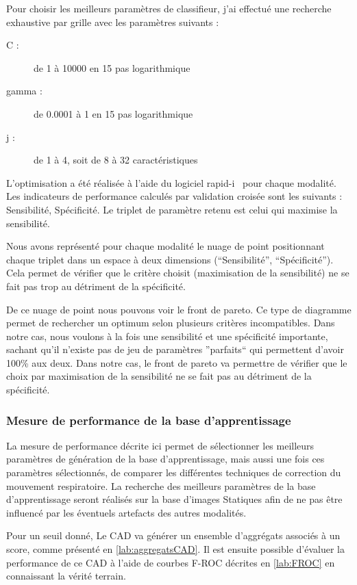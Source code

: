 Pour choisir les meilleurs paramètres de classifieur, j'ai effectué une recherche exhaustive par grille avec les paramètres suivants :

\begin{description}
 \item [C :] de 1 à 10000 en 15 pas logarithmique
 \item [gamma :] de 0.0001 à 1 en 15 pas logarithmique
 \item [j :] de 1 à 4, soit de 8 à 32 caractéristiques
\end{description}

L'optimisation a été réalisée à l'aide du logiciel rapid-i~\cite{mierswa2006} pour chaque modalité. Les indicateurs de performance calculés par validation croisée sont les suivants : Sensibilité, Spécificité. Le triplet de paramètre retenu est celui qui maximise la sensibilité.

Nous avons représenté pour chaque modalité le nuage de point positionnant chaque triplet dans un espace à deux dimensions (``Sensibilité'', ``Spécificité''). Cela permet de vérifier que le critère choisit (maximisation de la sensibilité) ne se fait pas trop au détriment de la spécificité.

De ce nuage de point nous pouvons voir le front de pareto. Ce type de diagramme permet de rechercher un optimum selon plusieurs critères incompatibles. Dans notre cas, nous voulons à la fois une sensibilité et une spécificité importante, sachant qu'il n'existe pas de jeu de paramètres ''parfaits`` qui permettent d'avoir 100\% aux deux. Dans notre cas, le front de pareto va permettre de vérifier que le choix par maximisation de la sensibilité ne se fait pas au détriment de la spécificité.


\subsubsection{Mesure de performance de la base d'apprentissage}

La mesure de performance décrite ici permet de sélectionner les meilleurs paramètres de génération de la base d'apprentissage, mais aussi une fois ces paramètres sélectionnés, de comparer les différentes techniques de correction du mouvement respiratoire. La recherche des meilleurs paramètres de la base d'apprentissage seront réalisés sur la base d'images Statiques afin de ne pas être influencé par les éventuels artefacts des autres modalités.

Pour un seuil donné, Le CAD va générer un ensemble d'aggrégats associés à un score, comme présenté en \ref{lab:aggregatsCAD}. Il est ensuite possible d'évaluer la performance de ce CAD à l'aide de courbes F-ROC décrites en \ref{lab:FROC} en connaissant la vérité terrain.


